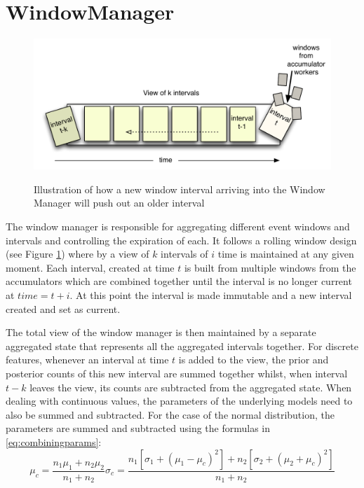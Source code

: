 \documentclass[a4paper,11pt]{scrreprt}
\begin{document}
\section{WindowManager}
\begin{figure}[h!]
\centering
\caption{Illustration of how a new window interval arriving into the Window Manager will push out an older interval}
\includegraphics[scale=0.72, trim=0 0 0 12, clip=true] {window.pdf}
\label{fig:rollingwindow}
\end{figure}
The window manager is responsible for aggregating different event windows and intervals and controlling the expiration of each. It follows a rolling window design (see Figure \ref{fig:rollingwindow}) where by a view of \(k\) intervals of \(i\) time is maintained at any given moment. Each interval, created at time \(t\) is built from multiple windows from the accumulators which are combined together until the interval is no longer current at \(time = t+i\). At this point the interval is made immutable and a new interval created and set as current. 

The total view of the window manager is then maintained by a separate aggregated state that represents all the aggregated intervals together. For discrete features, whenever an interval at time \(t\) is added to the view, the prior and posterior counts of this new interval are summed together whilst, when interval \(t-k\) leaves the view, its counts are subtracted from the aggregated state. When dealing with continuous values, the parameters of the underlying models need to also be summed and subtracted. For the case of the normal distribution, the parameters are summed and subtracted using the formulas in \ref{eq:combiningparams}:
\begin{subequations}
{\begin{equation}
\mu_c = \frac{n_1\mu_1 + n_2\mu_2}{n_1 + n_2}
\end{equation}
\begin{equation}
\sigma_c = \frac{n_1 [\sigma_1 + (\mu_1 - \mu_c)^2]+n_2[\sigma_2 + (\mu_2 + \mu_c)^2]}{n_1 + n_2}
\end{equation}}
\label{eq:combiningparams}
\end{subequations}
 
\end{document}
